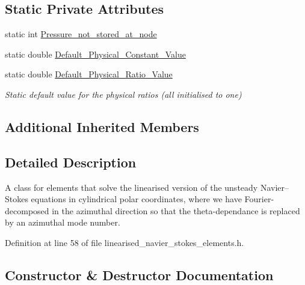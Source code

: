 \subsection*{Static Private Attributes}
\begin{DoxyCompactItemize}
\item 
static int \hyperlink{classoomph_1_1LinearisedNavierStokesEquations_a802ad13e3f5180773827aa47df8bf89e}{Pressure\+\_\+not\+\_\+stored\+\_\+at\+\_\+node}
\item 
static double \hyperlink{classoomph_1_1LinearisedNavierStokesEquations_aced3c00a02efbd2ae1408246c260996e}{Default\+\_\+\+Physical\+\_\+\+Constant\+\_\+\+Value}
\item 
static double \hyperlink{classoomph_1_1LinearisedNavierStokesEquations_ae64509a1058f2ff17330d0703a00934e}{Default\+\_\+\+Physical\+\_\+\+Ratio\+\_\+\+Value}
\begin{DoxyCompactList}\small\item\em Static default value for the physical ratios (all initialised to one) \end{DoxyCompactList}\end{DoxyCompactItemize}
\subsection*{Additional Inherited Members}


\subsection{Detailed Description}
A class for elements that solve the linearised version of the unsteady Navier--Stokes equations in cylindrical polar coordinates, where we have Fourier-\/decomposed in the azimuthal direction so that the theta-\/dependance is replaced by an azimuthal mode number. 

Definition at line 58 of file linearised\+\_\+navier\+\_\+stokes\+\_\+elements.\+h.



\subsection{Constructor \& Destructor Documentation}
\mbox{\label{classoomph_1_1LinearisedNavierStokesEquations_a003cf08dd97000e885e4f13b14a879b1}} 
